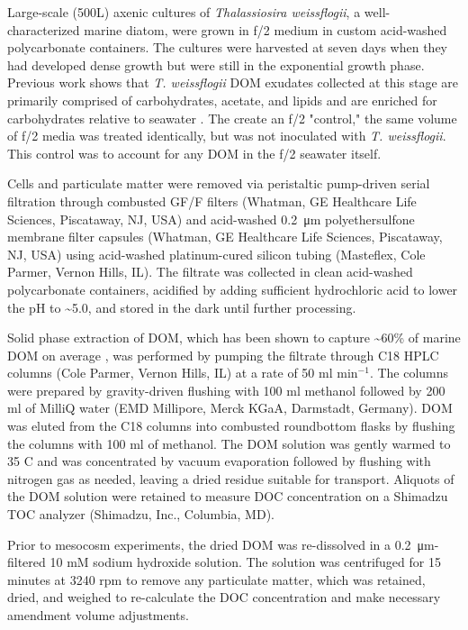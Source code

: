 Large-scale (500L) axenic cultures of \emph{Thalassiosira weissflogii}, a well-characterized marine diatom, were grown in f/2 medium \citep{f2guillard1975} in custom acid-washed polycarbonate containers. The cultures were harvested at seven days when they had developed dense growth but were still in the exponential growth phase. Previous work shows that \emph{T. weissflogii} DOM exudates collected at this stage are primarily comprised of carbohydrates, acetate, and lipids and are enriched for carbohydrates relative to seawater \citep{aluwihare1999comparison}. The create an f/2 "control," the same volume of f/2 media was treated identically, but was not inoculated with \emph{T. weissflogii}. This control was to account for any DOM in the f/2 seawater itself. 

Cells and particulate matter were removed via peristaltic pump-driven serial filtration through combusted GF/F filters (Whatman, GE Healthcare Life Sciences, Piscataway, NJ, USA) and acid-washed \SI{0.2}{\micro\meter} polyethersulfone membrane filter capsules (Whatman, GE Healthcare Life Sciences, Piscataway, NJ, USA) using acid-washed platinum-cured silicon tubing (Masteflex, Cole Parmer, Vernon Hills, IL). The filtrate was collected in clean acid-washed polycarbonate containers, acidified by adding sufficient hydrochloric acid to lower the pH to \textasciitilde{}5.0, and stored in the dark until further processing. 

Solid phase extraction of DOM, which has been shown to capture \textasciitilde{}60\% of marine DOM on average \citep{dittmar2008simple}, was performed by pumping the filtrate through C18 HPLC columns (Cole Parmer, Vernon Hills, IL) at a rate of 50 ml min$^{-1}$. The columns were prepared by gravity-driven flushing with 100 ml methanol followed by 200 ml of MilliQ water (EMD Millipore, Merck KGaA, Darmstadt, Germany). DOM was eluted from the C18 columns into combusted roundbottom flasks by flushing the columns with 100 ml of methanol. The DOM solution was gently warmed to 35 \textdegree C and was concentrated by vacuum evaporation followed by flushing with nitrogen gas as needed, leaving a dried residue suitable for transport. Aliquots of the DOM solution were retained to measure DOC concentration on a Shimadzu TOC analyzer (Shimadzu, Inc., Columbia, MD). 

Prior to mesocosm experiments, the dried DOM was re-dissolved in a \SI{0.2}{\micro\meter}-filtered 10 mM sodium hydroxide solution. The solution was centrifuged for 15 minutes at 3240 rpm to remove any particulate matter, which was retained, dried, and weighed to re-calculate the DOC concentration and make necessary amendment volume adjustments. 

